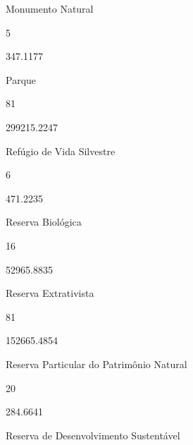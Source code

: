 \documentclass[
  letterpaper,
]{report}
\begin{document}
\n    

\n      

Monumento Natural

\n      

5

\n      

347.1177

\n    

\n    

\n      

Parque

\n      

81

\n      

299215.2247

\n    

\n    

\n      

Refúgio de Vida Silvestre

\n      

6

\n      

471.2235

\n    

\n    

\n      

Reserva Biológica

\n      

16

\n      

52965.8835

\n    

\n    

\n      

Reserva Extrativista

\n      

81

\n      

152665.4854

\n    

\n    

\n      

Reserva Particular do Patrimônio Natural

\n      

20

\n      

284.6641

\n    

\n    

\n      

Reserva de Desenvolvimento Sustentável
\end{document}
